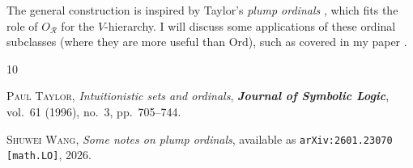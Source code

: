 \documentclass[bsl,meeting]{asl}
\begin{document}
The general construction is inspired by Taylor's \emph{plump ordinals} \cite{taylor96-intuitionistic-ordinals}, which fits the role of $O_\mathscr{R}$ for the $V$-hierarchy. I will discuss some applications of these ordinal subclasses (where they are more useful than $\mathrm{Ord}$), such as covered in my paper \cite{wang-sw26-plump}.

\begin{thebibliography}{10}

   {\scshape Paul Taylor}, {\itshape Intuitionistic sets and ordinals}, {\bfseries\itshape Journal of Symbolic Logic}, vol.~61 (1996), no.~3, pp.~705--744.

   {\scshape Shuwei Wang}, {\itshape Some notes on plump ordinals}, available as {\tt arXiv:2601.23070 [math.LO]}, 2026.

\end{thebibliography}

\vspace*{-0.5\baselineskip}
\end{document}
